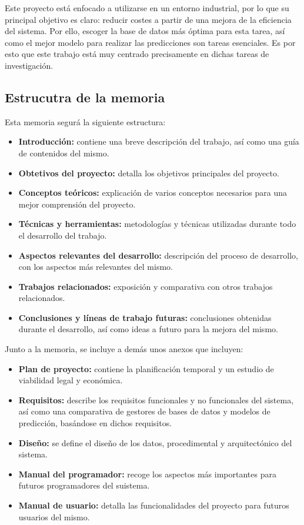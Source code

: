 Este proyecto está enfocado a utilizarse en un entorno industrial, por lo que su principal objetivo es claro:
reducir costes a partir de una mejora de la eficiencia del sistema. Por ello, escoger la base de datos más 
óptima para esta tarea, así como el mejor modelo para realizar las predicciones son tareas esenciales. Es por 
esto que este trabajo está muy centrado precisamente en dichas tareas de investigación.

\subsection{Estrucutra de la memoria}

Esta memoria segurá la siguiente estructura:
\begin{itemize}
    \item \textbf{Introducción:} contiene una breve descripción del trabajo, así como una guía de contenidos del mismo.
    \item \textbf{Obtetivos del proyecto:} detalla los objetivos principales del proyecto.
    \item \textbf{Conceptos teóricos:} explicación de varios conceptos necesarios para una mejor comprensión del
        proyecto.
    \item \textbf{Técnicas y herramientas:} metodologías y técnicas utilizadas durante todo el desarrollo del 
        trabajo.
    \item \textbf{Aspectos relevantes del desarrollo:} descripción del proceso de desarrollo, con los aspectos
        más relevantes del mismo.
    \item \textbf{Trabajos relacionados:} exposición y comparativa con otros trabajos relacionados.
    \item \textbf{Conclusiones y líneas de trabajo futuras:} conclusiones obtenidas durante el desarrollo, así
        como ideas a futuro para la mejora del mismo.
\end{itemize}

Junto a la memoria, se incluye a demás unos anexos que incluyen:
\begin{itemize}
    \item \textbf{Plan de proyecto:} contiene la planificación temporal y un estudio de viabilidad legal y
        económica.
    \item \textbf{Requisitos:} describe los requisitos funcionales y no funcionales del sistema, así como una
        comparativa de gestores de bases de datos y modelos de predicción, basándose en dichos requisitos.
    \item \textbf{Diseño:} se define el diseño de los datos, procedimental y arquitectónico del sistema.
    \item \textbf{Manual del programador:} recoge los aspectos más importantes para futuros programadores del suistema.
    \item \textbf{Manual de usuario:} detalla las funcionalidades del proyecto para futuros usuarios del
        mismo.
\end{itemize}

